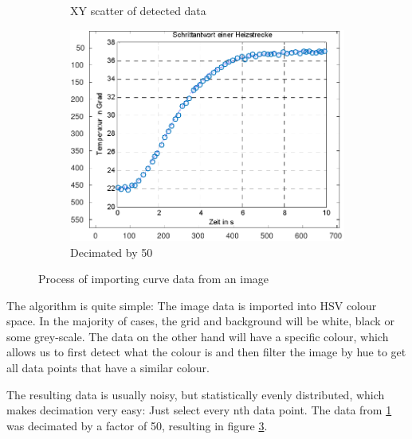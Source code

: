 \begin{figure}
\begin{subfigure}{.3\textwidth}
        \caption{XY scatter of detected data}
        \label{fig:image:scatter_raw}
    \end{subfigure}
    \begin{subfigure}{.3\textwidth}
        \includegraphics[width=.95\linewidth]{images/scatter_decimated_50}
        \caption{Decimated by 50}
        \label{fig:image:scatter_dec}
    \end{subfigure}
    \caption{Process of importing curve data from an image}
\end{figure}

The algorithm is quite simple: The image data is imported into HSV colour space.
In  the majority of cases, the grid and background will be white, black or  some
grey-scale. The data on the other hand will have a specific colour, which allows
us to first detect  what  the  colour is and then filter the image by hue to get
all data points that have a similar colour.

The resulting data is usually noisy, but statistically evenly distributed, which
makes  decimation  very easy: Just select every nth data point.  The  data  from
\ref{fig:image:scatter_raw} was decimated by a factor of 50, resulting in figure
\ref{fig:image:scatter_dec}.
